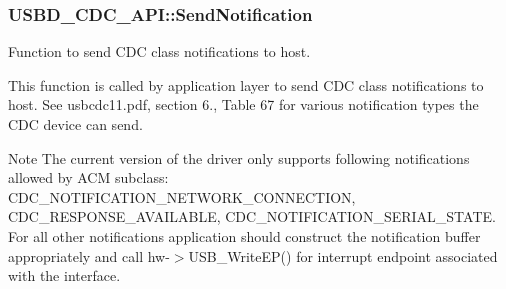 \subsubsection[{\texorpdfstring{Send\+Notification}{SendNotification}}]{ U\+S\+B\+D\+\_\+\+C\+D\+C\+\_\+\+A\+P\+I\+::\+Send\+Notification}\hypertarget{structUSBD__CDC__API_a39f1af8073c7e98a7a96ac68e612e7fe}{}\label{structUSBD__CDC__API_a39f1af8073c7e98a7a96ac68e612e7fe}
Function to send C\+DC class notifications to host.

This function is called by application layer to send C\+DC class notifications to host. See usbcdc11.\+pdf, section 6., Table 67 for various notification types the C\+DC device can send. \begin{DoxyNote}{Note}
The current version of the driver only supports following notifications allowed by A\+CM subclass\+: C\+D\+C\+\_\+\+N\+O\+T\+I\+F\+I\+C\+A\+T\+I\+O\+N\+\_\+\+N\+E\+T\+W\+O\+R\+K\+\_\+\+C\+O\+N\+N\+E\+C\+T\+I\+ON, C\+D\+C\+\_\+\+R\+E\+S\+P\+O\+N\+S\+E\+\_\+\+A\+V\+A\+I\+L\+A\+B\+LE, C\+D\+C\+\_\+\+N\+O\+T\+I\+F\+I\+C\+A\+T\+I\+O\+N\+\_\+\+S\+E\+R\+I\+A\+L\+\_\+\+S\+T\+A\+TE. ~\newline
 For all other notifications application should construct the notification buffer appropriately and call hw-\/$>$U\+S\+B\+\_\+\+Write\+E\+P() for interrupt endpoint associated with the interface.
\end{DoxyNote}

